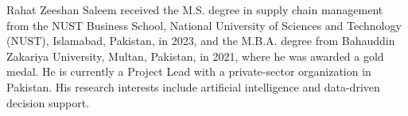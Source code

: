 \documentclass[lettersize,journal]{IEEEtran}
\begin{document}
\begin{IEEEbiographynophoto}{Rahat Zeeshan Saleem}
received the M.S. degree in supply chain management
from the NUST Business School, National University of Sciences and
Technology (NUST), Islamabad, Pakistan, in 2023, and the M.B.A. degree
from Bahauddin Zakariya University, Multan, Pakistan, in 2021, where he was
awarded a gold medal. He is currently a Project Lead with a private-sector
organization in Pakistan. His research interests include artificial intelligence
and data-driven decision support.
\end{IEEEbiographynophoto}
\vfill
\end{document}
